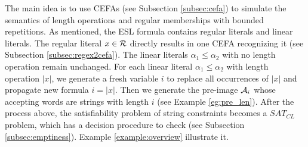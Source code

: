 
The main idea is to use CEFAs (see Subsection \ref{subsec:cefa}) to simulate the semantics of length operations and regular memberships with bounded repetitions. As mentioned, the ESL formula contains regular literals and linear literals. The regular literal $x\in \mathcal{R}$ directly results in one CEFA recognizing it (see Subsection \ref{subsec:regex2cefa}). The linear literals $\alpha_1 \leq \alpha_2$ with no length operation remain unchanged. For each linear literal $\alpha_1 \leq \alpha_2$ with length operation $|x|$, we generate a fresh variable $i$ to replace all occurrences of $|x|$ and propagate new formula $i=|x|$. Then we generate the pre-image $\mathcal{A}_{i}$ whose accepting words are strings with length $i$ (see Example \ref{eg:pre_len}). After the process above, the satisfiability problem of string constraints becomes a $SAT_{CL}$ problem, which has a decision procedure to check (see Subsection \ref{subsec:emptiness}). Example \ref{example:overview} illustrate it. \newline

